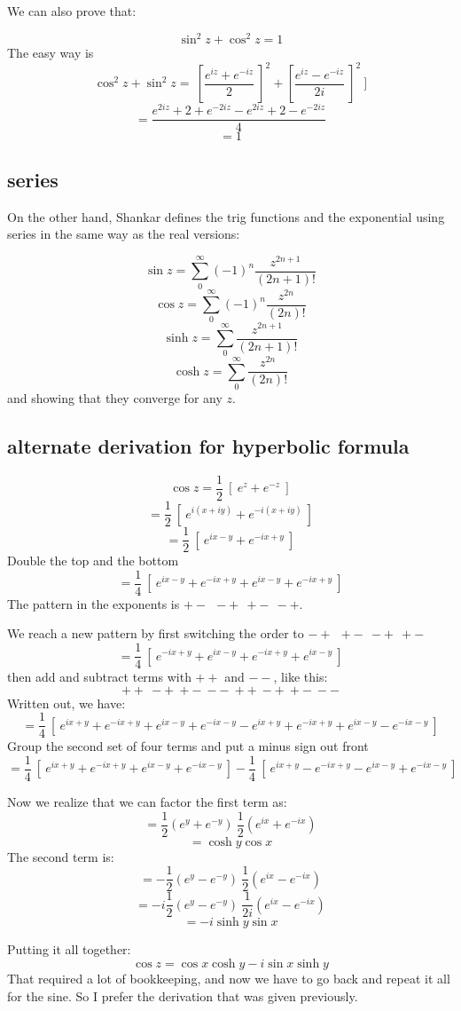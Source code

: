 \documentclass[11pt, oneside]{article}   	%
\begin{document}
We can also prove that:

\[ \sin^2 z + \cos^2 z = 1 \]
The easy way is
\[ \cos^2 z + \sin^2 z = \ [ \frac{e^{iz} + e^{-iz}}{2} \ ]^2 +  [ \frac{e^{iz} - e^{-iz}}{2i} \ ]^2 \ ] \]
\[= \frac{e^{2iz} + 2 + e^{-2iz} - e^{2iz} + 2 - e^{-2iz} }{4} \]
\[ = 1 \]

\subsection*{series}
On the other hand, Shankar defines the trig functions and the exponential using series in the same way as the real versions:

\[ \sin z = \sum_0^{\infty} (-1)^n \frac{z^{2n+1}}{(2n +1)!} \]
\[ \cos z = \sum_0^{\infty} (-1)^n \frac{z^{2n}}{(2n)!} \]
\[ \sinh z = \sum_0^{\infty} \frac{z^{2n+1}}{(2n +1)!} \]
\[ \cosh z = \sum_0^{\infty} \frac{z^{2n}}{(2n)!} \]
and showing that they converge for any $z$.

\subsection*{alternate derivation for hyperbolic formula}
\[ \cos z = \frac{1}{2} \ [ \ e^{z} + e^{-z} \ ]  \]
\[ = \frac{1}{2} \ [ \ e^{i(x+iy)} + e^{-i(x + iy)} \ ]  \]
\[ = \frac{1}{2} \ [ \ e^{ix - y} + e^{-ix + y} \ ]  \]
Double the top and the bottom
\[ = \frac{1}{4} \ [ \ e^{ix - y} + e^{-ix + y} + e^{ix - y} + e^{-ix + y}  \ ]  \]
The pattern in the exponents is $+- \ \ -+ \ \ +- \ \ -+$.  

We reach a new pattern by first switching the order to $-+ \ \ +- \ \ -+ \ \ +-$ 
\[ = \frac{1}{4} \ [ \  e^{-ix + y} + e^{ix - y} + e^{-ix + y}  + e^{ix - y} \ ]  \]
then add and subtract terms with $++$ and $--$, like this:
\[ ++ \ -+ \ +- \ -- \ ++ \ -+ \ +- \ -- \]
Written out, we have:
\[ = \frac{1}{4} \ [ \  e^{ix + y} + e^{-ix + y} + e^{ix - y} + e^{-ix - y} - e^{ix + y} + e^{-ix + y}  + e^{ix - y} - e^{-ix - y} \ ]  \]
Group the second set of four terms and put a minus sign out front
\[ = \frac{1}{4} \ [ \  e^{ix + y} + e^{-ix + y} + e^{ix - y} + e^{-ix - y} \ ] - \frac{1}{4} \ [ \ e^{ix + y} - e^{-ix + y}  - e^{ix - y} + e^{-ix - y} \ ]  \]

Now we realize that we can factor the first term as:
\[ = \frac{1}{2}(e^y + e^{-y}) \ \frac{1}{2} (e^{ix} + e^{-ix}) \]
\[ = \cosh y \cos x \]
The second term is:
\[ = - \frac{1}{2}(e^y - e^{-y}) \ \frac{1}{2} (e^{ix} - e^{-ix}) \]
\[ = -i \frac{1}{2}(e^y - e^{-y}) \ \frac{1}{2i} (e^{ix} - e^{-ix}) \]
\[ = -i \sinh y \sin x \]

Putting it all together:
\[ \cos z = \cos x \cosh y - i \sin x \sinh y \]
That required a lot of bookkeeping, and now we have to go back and repeat it all for the sine.  So I prefer the derivation that was given previously.
\end{document}
